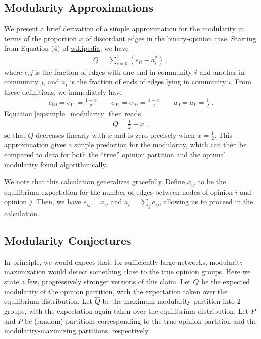\documentclass[english]{scrartcl}
\begin{document}
	\subsection{Modularity Approximations}
		We present a brief derivation of a simple approximation for the modularity in terms of the proportion $x$ of discordant edges in the binary-opinion case. Starting from Equation (4) of \url{wikipedia}, we have 
		\begin{align}
			Q = \sum_{i = 0}^1 (e_{ii} - a_i^2)\;, \label{eq:simple_modularity}
		\end{align}
		where $e_ij$ is the fraction of edges with one end in community $i$ and another in community $j$, and $a_i$ is the fraction of ends of edges lying in community $i$. From these definitions, we immediately have 
		\begin{align*}
			e_{00} = e_{11} = \frac{1-x}{2} \quad\quad e_{01} = e_{10} = \frac{1-x}{2} \quad\quad a_0  = a_1    = \frac{1}{2}\;.
		\end{align*}
		Equation \eqref{eq:simple_modularity} then reads 
		\begin{align*}
			Q = \frac{1}{2} - x\;,
		\end{align*}
		so that $Q$ decreases linearly with $x$ and is zero precisely when $x = \frac{1}{2}$. This approximation gives a simple prediction for the modularity, which can then be compared to data for both the ``true'' opinion partition and the optimal modularity found algorithmically. 

		We note that this calculation generalizes gracefully. Define $x_{ij}$ to be the equilibrium expectation for the number of edges between nodes of opinion $i$ and opinion $j$. Then, we have $e_{ij} = x_{ij}$ and $a_{i} = \sum_{j} e_{ij}$, allowing us to proceed in the calculation. 

	\subsection{Modularity Conjectures}
		In principle, we would expect that, for sufficiently large networks, modularity maximization would detect something close to the true opinion groups. Here we state a few, progressively stronger versions of this claim. Let $Q$ be the expected modularity of the opinion partition, with the expectation taken over the equilibrium distribution. Let $\hat{Q}$ be the maximum-modularity partition into $2$ groups, with the expectation again taken over the equilibrium distribution. Let $P$ and $\hat{P}$ be (random) partitions corresponding to the true opinion partition and the modularity-maximizing partitions, respectively. 
\end{document}

